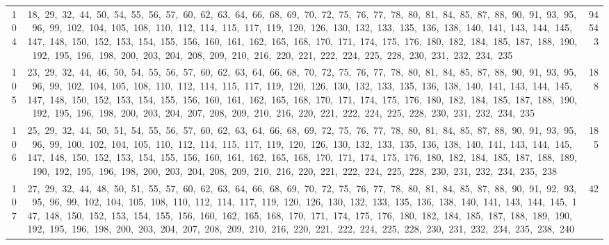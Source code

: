\begin{longtable}{c|p{}|r}
104 & 18,\ 29,\ 32,\ 44,\ 50,\ 54,\ 55,\ 56,\ 57,\ 60,\ 62,\ 63,\ 64,\ 66,\ 68,\ 69,\ 70,\ 72,\ 75,\ 76,\ 77,\ 78,\ 80,\ 81,\ 84,\ 85,\ 87,\ 88,\ 90,\ 91,\ 93,\ 95,\ 96,\ 99,\ 102,\ 104,\ 105,\ 108,\ 110,\ 112,\ 114,\ 115,\ 117,\ 119,\ 120,\ 126,\ 130,\ 132,\ 133,\ 135,\ 136,\ 138,\ 140,\ 141,\ 143,\ 144,\ 145,\ 147,\ 148,\ 150,\ 152,\ 153,\ 154,\ 155,\ 156,\ 160,\ 161,\ 162,\ 165,\ 168,\ 170,\ 171,\ 174,\ 175,\ 176,\ 180,\ 182,\ 184,\ 185,\ 187,\ 188,\ 190,\ 192,\ 195,\ 196,\ 198,\ 200,\ 203,\ 204,\ 208,\ 209,\ 210,\ 216,\ 220,\ 221,\ 222,\ 224,\ 225,\ 228,\ 230,\ 231,\ 232,\ 234,\ 235 & 94543 \\
105 & 23,\ 29,\ 32,\ 44,\ 46,\ 50,\ 54,\ 55,\ 56,\ 57,\ 60,\ 62,\ 63,\ 64,\ 66,\ 68,\ 70,\ 72,\ 75,\ 76,\ 77,\ 78,\ 80,\ 81,\ 84,\ 85,\ 87,\ 88,\ 90,\ 91,\ 93,\ 95,\ 96,\ 99,\ 102,\ 104,\ 105,\ 108,\ 110,\ 112,\ 114,\ 115,\ 117,\ 119,\ 120,\ 126,\ 130,\ 132,\ 133,\ 135,\ 136,\ 138,\ 140,\ 141,\ 143,\ 144,\ 145,\ 147,\ 148,\ 150,\ 152,\ 153,\ 154,\ 155,\ 156,\ 160,\ 161,\ 162,\ 165,\ 168,\ 170,\ 171,\ 174,\ 175,\ 176,\ 180,\ 182,\ 184,\ 185,\ 187,\ 188,\ 190,\ 192,\ 195,\ 196,\ 198,\ 200,\ 203,\ 204,\ 207,\ 208,\ 209,\ 210,\ 216,\ 220,\ 221,\ 222,\ 224,\ 225,\ 228,\ 230,\ 231,\ 232,\ 234,\ 235 & 188 \\
106 & 25,\ 29,\ 32,\ 44,\ 50,\ 51,\ 54,\ 55,\ 56,\ 57,\ 60,\ 62,\ 63,\ 64,\ 66,\ 68,\ 69,\ 72,\ 75,\ 76,\ 77,\ 78,\ 80,\ 81,\ 84,\ 85,\ 87,\ 88,\ 90,\ 91,\ 93,\ 95,\ 96,\ 99,\ 100,\ 102,\ 104,\ 105,\ 110,\ 112,\ 114,\ 115,\ 117,\ 119,\ 120,\ 126,\ 130,\ 132,\ 133,\ 135,\ 136,\ 138,\ 140,\ 141,\ 143,\ 144,\ 145,\ 147,\ 148,\ 150,\ 152,\ 153,\ 154,\ 155,\ 156,\ 160,\ 161,\ 162,\ 165,\ 168,\ 170,\ 171,\ 174,\ 175,\ 176,\ 180,\ 182,\ 184,\ 185,\ 187,\ 188,\ 189,\ 190,\ 192,\ 195,\ 196,\ 198,\ 200,\ 203,\ 204,\ 208,\ 209,\ 210,\ 216,\ 220,\ 221,\ 222,\ 224,\ 225,\ 228,\ 230,\ 231,\ 232,\ 234,\ 235,\ 238 & 185 \\
107 & 27,\ 29,\ 32,\ 44,\ 48,\ 50,\ 51,\ 55,\ 57,\ 60,\ 62,\ 63,\ 64,\ 66,\ 68,\ 69,\ 70,\ 72,\ 75,\ 76,\ 77,\ 78,\ 80,\ 81,\ 84,\ 85,\ 87,\ 88,\ 90,\ 91,\ 92,\ 93,\ 95,\ 96,\ 99,\ 102,\ 104,\ 105,\ 108,\ 110,\ 112,\ 114,\ 117,\ 119,\ 120,\ 126,\ 130,\ 132,\ 133,\ 135,\ 136,\ 138,\ 140,\ 141,\ 143,\ 144,\ 145,\ 147,\ 148,\ 150,\ 152,\ 153,\ 154,\ 155,\ 156,\ 160,\ 162,\ 165,\ 168,\ 170,\ 171,\ 174,\ 175,\ 176,\ 180,\ 182,\ 184,\ 185,\ 187,\ 188,\ 189,\ 190,\ 192,\ 195,\ 196,\ 198,\ 200,\ 203,\ 204,\ 207,\ 208,\ 209,\ 210,\ 216,\ 220,\ 221,\ 222,\ 224,\ 225,\ 228,\ 230,\ 231,\ 232,\ 234,\ 235,\ 238,\ 240 & 42 \\

\end{longtable}
